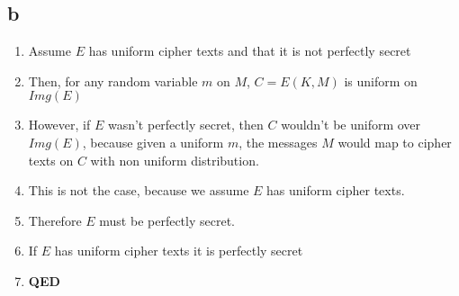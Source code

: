 \documentclass[]{article}
\begin{document}
\subsection{b}
\begin{enumerate}
	\item Assume $E$ has uniform cipher texts and that it is not perfectly secret
	\item Then, for any random variable $m$ on $M$, $C = E(K,M)$ is uniform on $Img(E)$
	\item However, if $E$ wasn't perfectly secret, then $C$ wouldn't be uniform over $Img(E)$, because given a uniform $m$, the messages $M$ would map to cipher texts on $C$ with non uniform distribution.
	\item This is not the case, because we assume $E$ has uniform cipher texts.
	\item Therefore $E$ must be perfectly secret.
	\item If $E$ has uniform cipher texts it is perfectly secret
	\item \textbf{QED}

\end{enumerate}
\end{document}
